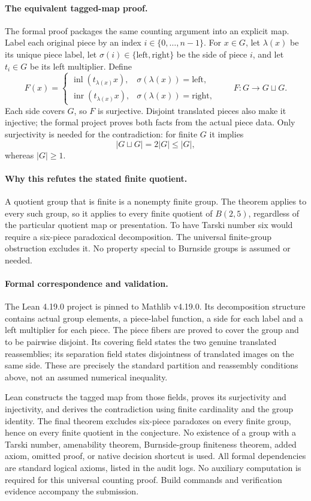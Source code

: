 \documentclass[11pt]{article}
\begin{document}
\paragraph{The equivalent tagged-map proof.} The formal proof packages the same counting argument into an explicit map. Label each original piece by an index $i\in\{0,\ldots,n-1\}$. For $x\in G$, let $\lambda(x)$ be its unique piece label, let $\sigma(i)\in\{\mathrm{left},\mathrm{right}\}$ be the side of piece $i$, and let $t_i\in G$ be its left multiplier. Define
\[
F(x)=
\begin{cases}
\operatorname{inl}(t_{\lambda(x)}x),&\sigma(\lambda(x))=\mathrm{left},\\
\operatorname{inr}(t_{\lambda(x)}x),&\sigma(\lambda(x))=\mathrm{right},
\end{cases}
\qquad F:G\longrightarrow G\sqcup G.
\]
Each side covers $G$, so $F$ is surjective. Disjoint translated pieces also make it injective; the formal project proves both facts from the actual piece data. Only surjectivity is needed for the contradiction: for finite $G$ it implies
\[
|G\sqcup G|=2|G|\leq|G|,
\]
whereas $|G|\geq1$.

\paragraph{Why this refutes the stated finite quotient.} A quotient group that is finite is a nonempty finite group. The theorem applies to every such group, so it applies to every finite quotient of $B(2,5)$, regardless of the particular quotient map or presentation. To have Tarski number six would require a six-piece paradoxical decomposition. The universal finite-group obstruction excludes it. No property special to Burnside groups is assumed or needed.

\paragraph{Formal correspondence and validation.} The Lean 4.19.0 project is pinned to Mathlib v4.19.0. Its decomposition structure contains actual group elements, a piece-label function, a side for each label and a left multiplier for each piece. The piece fibers are proved to cover the group and to be pairwise disjoint. Its covering field states the two genuine translated reassemblies; its separation field states disjointness of translated images on the same side. These are precisely the standard partition and reassembly conditions above, not an assumed numerical inequality.

Lean constructs the tagged map from those fields, proves its surjectivity and injectivity, and derives the contradiction using finite cardinality and the group identity. The final theorem excludes six-piece paradoxes on every finite group, hence on every finite quotient in the conjecture. No existence of a group with a Tarski number, amenability theorem, Burnside-group finiteness theorem, added axiom, omitted proof, or native decision shortcut is used. All formal dependencies are standard logical axioms, listed in the audit logs. No auxiliary computation is required for this universal counting proof. Build commands and verification evidence accompany the submission.
\end{document}
